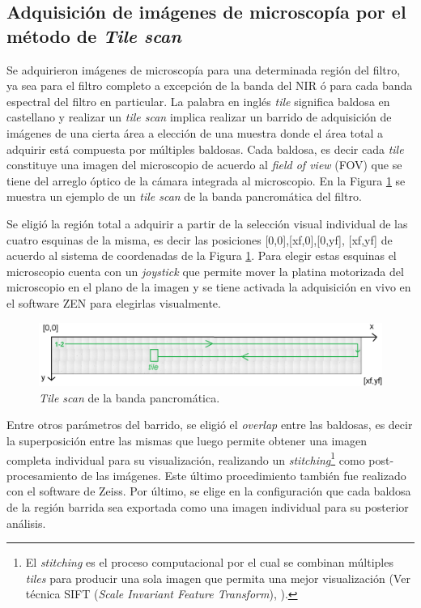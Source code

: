 \singlespacing
\subsection{Adquisición de imágenes de microscopía por el método de \textit{Tile scan}}
\label{subs:tilsc}

\hspace{0.5cm}Se adquirieron imágenes de microscopía para una determinada región del filtro, ya sea para el filtro completo a excepción de la banda del NIR ó para cada banda espectral del filtro en particular. La palabra en inglés \textit{tile} significa baldosa en castellano y realizar un \textit{tile scan} implica realizar un barrido de adquisición de imágenes de una cierta área a elección de una muestra donde el área total a adquirir está compuesta por múltiples baldosas. Cada baldosa, es decir cada \textit{tile} constituye una imagen del microscopio de acuerdo al \textit{field of view} (FOV) que se tiene del arreglo óptico de la cámara integrada al microscopio. En la Figura \ref{fig:tilescan} se muestra un ejemplo de un \textit{tile scan} de la banda pancromática del filtro.

Se eligió la región total a adquirir a partir de la selección visual individual de las cuatro esquinas de la misma, es decir las posiciones [0,0],[xf,0],[0,yf], [xf,yf] de acuerdo al sistema de coordenadas de la Figura \ref{fig:tilescan}. Para elegir estas esquinas el microscopio cuenta con un \textit{joystick} que permite mover la platina motorizada del microscopio en el plano de la imagen y se tiene activada la adquisición en vivo en el software ZEN para elegirlas visualmente.


\begin{figure}[H]
	\centering
	\includegraphics[width=1.0\textwidth]{Figs/cuantificaciondefectos/tilescan.png}
	\caption{\textit{Tile scan} de la banda pancromática.}
	\label{fig:tilescan}
\end{figure} 

Entre otros parámetros del barrido, se eligió el \textit{overlap} entre las baldosas, es decir la superposición entre las mismas que luego permite obtener una imagen completa individual para su visualización,  realizando un \textit{stitching}\footnote{El \textit{stitching} es el proceso computacional por el cual se combinan múltiples \textit{tiles} para
producir una sola imagen que permita una mejor visualización (Ver técnica SIFT (\textit{Scale Invariant Feature Transform}), \cite{Lowe}).} como post-procesamiento de las imágenes. Este último procedimiento también fue realizado con el software de Zeiss. Por último, se elige en la configuración que cada baldosa de la región barrida sea exportada como una imagen individual para su posterior análisis.

